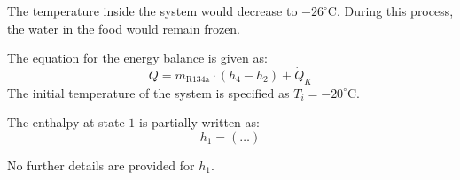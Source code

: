 The temperature inside the system would decrease to \(-26^\circ\text{C}\). During this process, the water in the food would remain frozen.

The equation for the energy balance is given as:  
\[
Q = \dot{m}_{\text{R134a}} \cdot (h_4 - h_2) + \dot{Q}_K
\]  
The initial temperature of the system is specified as \( T_i = -20^\circ\text{C} \).  

The enthalpy at state \( 1 \) is partially written as:  
\[
h_1 = (\ldots)
\]  

No further details are provided for \( h_1 \).